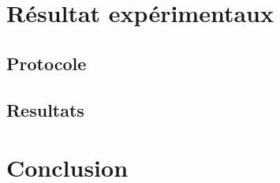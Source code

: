 \documentclass[soumission]{ir}
\begin{document}
\section{Résultat expérimentaux}

\subsection{Protocole}

\subsection{Resultats}

\section{Conclusion}





\appendix
\end{document}
